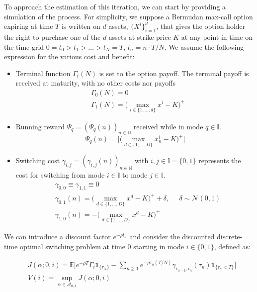 \documentclass{article}
\begin{document}
To approach the estimation of this iteration, we can start by providing a simulation of the process. For simplicity, we suppose a Bermudan max-call option expiring at time $T$ is written on $d$ assets, $\{X^i\}_{i=1}^d$, that gives the option holder the right to purchase one of the $d$ assets at strike price $K$ at any point in time on the time grid $0=t_0 > t_1> \ldots > t_N = T$, $t_n = n \cdot T/N$. We assume the following expression for the various cost and benefit:
\begin{itemize}
    \item Terminal function $\Gamma_i(N)$ is set to the option payoff. The terminal payoff is received at maturity, with no other costs nor payoffs
    \begin{equation}
    \begin{split}
    &\Gamma_0(N) = 0 \\
    &\Gamma_1(N) = \Big(\max_{i \in \{1, \ldots, d \}} x^i - K   \Big)^{+}
    \end{split}
    \end{equation}
    \item Running reward $\Psi_q = (\Psi_q(n))_{n \in \mathbb{N}}$ received while in mode $q \in \mathbb{I}$. 
    \begin{equation}
    \Psi_q(n) = \Big[\Big(\max_{d \in \{1, \ldots, D\}} x^i_n - K   \Big)^{+} \Big]
    \end{equation}
    \item Switching cost $\gamma_{i, j} = (\gamma_{i, j}(n))_{n \in \mathbb{N}}$ with $i,j \in \mathbb{I} = \{0, 1 \}$ represents the cost for switching from mode $i \in \mathbb{I}$ to mode $j \in \mathbb{I}$.
    \begin{equation}
    \begin{split}
    &\gamma_{0,0} \equiv \gamma_{1,1} \equiv 0 \\
    &\gamma_{0,1}(n) = \Big(\max_{d \in \{1, \ldots, D \}} x^d - K   \Big)^{+} + \delta,  \;\;\;\;\; \delta \sim \mathcal{N}(0,1)  \\ 
    &\gamma_{1, 0}(n) = -\Big(\max_{d \in \{1, \ldots, D \}} x^d - K   \Big)^{+} 
    \end{split}
    \end{equation}
\end{itemize}

We can introduce a discount factor $e^{- \rho t_n}$ and consider the discounted discrete-time optimal switching problem at time 0 starting in mode $i \in \{0,1\}$, defined as:

\begin{equation}
\begin{split}
    &J(\alpha; 0, i)= \mathbb{E} \Big[e^{- \rho T} \Gamma_{i}\mathbf{1}_{\{\tau_N \}} - \sum_{n \geq 1} e^{- \rho \tau_n (T/N)} \gamma_{\iota_{n-1}, \iota_n}(\tau_n) \mathbf{1}_{\{\tau_n < T \}} \Big]\\
    &V(i) = \sup_{\alpha \in \mathcal{A}_{0,1}} J(\alpha; 0,i)
\end{split}
\end{equation}
\end{document}
